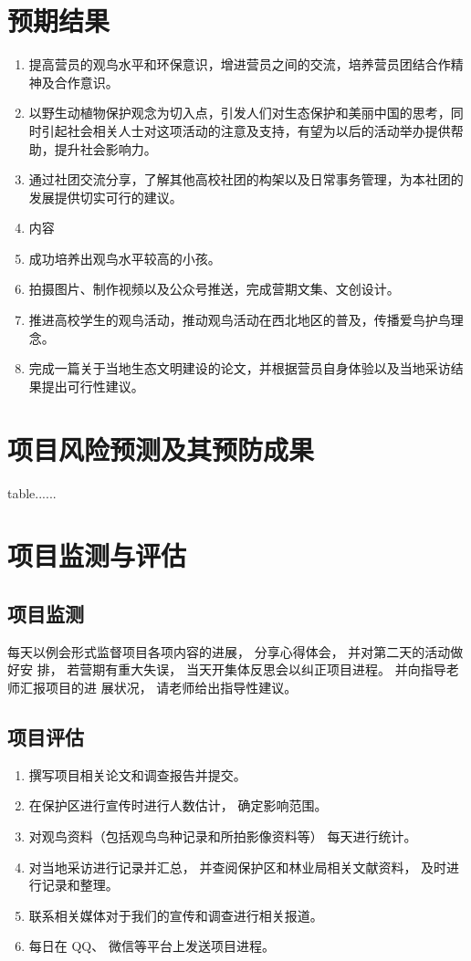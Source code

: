 \documentclass[UTF8,a4paper，12pt]{ctexart}
\begin{document}
\section{预期结果}
\begin{enumerate}[itemindent=1em]
\item 提高营员的观鸟水平和环保意识，增进营员之间的交流，培养营员团结合作精神及合作意识。
\item 以野生动植物保护观念为切入点，引发人们对生态保护和美丽中国的思考，同时引起社会相关人士对这项活动的注意及支持，有望为以后的活动举办提供帮助，提升社会影响力。
\item 通过社团交流分享，了解其他高校社团的构架以及日常事务管理，为本社团的发展提供切实可行的建议。
\item 内容
\item 成功培养出观鸟水平较高的小孩。
\item 拍摄图片、制作视频以及公众号推送，完成营期文集、文创设计。
\item 推进高校学生的观鸟活动，推动观鸟活动在西北地区的普及，传播爱鸟护鸟理念。
\item 完成一篇关于当地生态文明建设的论文，并根据营员自身体验以及当地采访结果提出可行性建议。
\end{enumerate}
\section{项目风险预测及其预防成果}
table......
\section{项目监测与评估}
\subsection{项目监测}
每天以例会形式监督项目各项内容的进展， 分享心得体会， 并对第二天的活动做好安
排， 若营期有重大失误， 当天开集体反思会以纠正项目进程。 并向指导老师汇报项目的进
展状况， 请老师给出指导性建议。

\subsection{项目评估}
\begin{enumerate}[itemindent=1em]
\item 撰写项目相关论文和调查报告并提交。
\item 在保护区进行宣传时进行人数估计， 确定影响范围。
\item 对观鸟资料（包括观鸟鸟种记录和所拍影像资料等） 每天进行统计。
\item 对当地采访进行记录并汇总， 并查阅保护区和林业局相关文献资料， 及时进行记录和整理。
\item  联系相关媒体对于我们的宣传和调查进行相关报道。
\item  每日在 QQ、 微信等平台上发送项目进程。
\end{enumerate}
\end{document}
